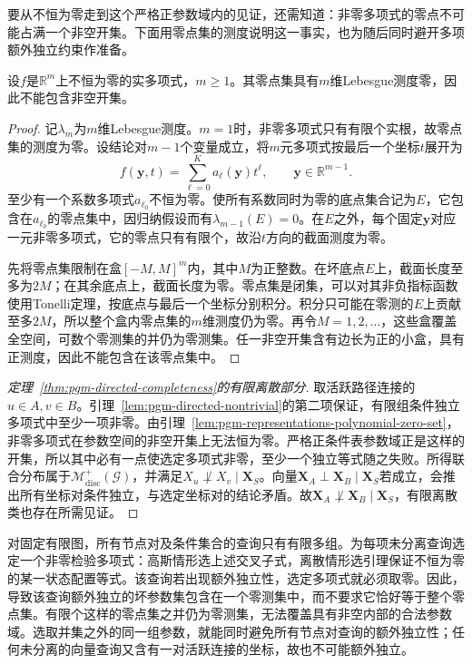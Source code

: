 要从不恒为零走到这个严格正参数域内的见证，还需知道：非零多项式的零点不可能占满一个非空开集。下面用零点集的测度说明这一事实，也为随后同时避开多项额外独立约束作准备。

\begin{lemma}[非零多项式的零点集]
  \label{lem:pgm-representations-polynomial-zero-set}
  设$f$是$\mathbb R^m$上不恒为零的实多项式，$m\geq1$。其零点集具有$m$维Lebesgue测度零，因此不能包含非空开集。
\end{lemma}

\begin{proof}
记$\lambda_m$为$m$维Lebesgue测度。$m=1$时，非零多项式只有有限个实根，故零点集的测度为零。设结论对$m-1$个变量成立，将$m$元多项式按最后一个坐标$t$展开为
\[
  f(\bm y,t)=\sum_{\ell=0}^{K}a_\ell(\bm y)t^\ell,
  \qquad \bm y\in\mathbb R^{m-1}.
\]
至少有一个系数多项式$a_{\ell_0}$不恒为零。使所有系数同时为零的底点集合记为$E$，它包含在$a_{\ell_0}$的零点集中，因归纳假设而有$\lambda_{m-1}(E)=0$。在$E$之外，每个固定$\bm y$对应一元非零多项式，它的零点只有有限个，故沿$t$方向的截面测度为零。

先将零点集限制在盒$[-M,M]^m$内，其中$M$为正整数。在坏底点$E$上，截面长度至多为$2M$；在其余底点上，截面长度为零。零点集是闭集，可以对其非负指标函数使用Tonelli定理，按底点与最后一个坐标分别积分。积分只可能在零测的$E$上贡献至多$2M$，所以整个盒内零点集的$m$维测度仍为零。再令$M=1,2,\ldots$，这些盒覆盖全空间，可数个零测集的并仍为零测集。任一非空开集含有边长为正的小盒，具有正测度，因此不能包含在该零点集中。
\end{proof}

\begin{proof}[定理~\ref{thm:pgm-directed-completeness}的有限离散部分]
取活跃路径连接的$u\in A,v\in B$。引理~\ref{lem:pgm-directed-nontrivial}的第二项保证，有限组条件独立多项式中至少一项非零。由引理~\ref{lem:pgm-representations-polynomial-zero-set}，非零多项式在参数空间的非空开集上无法恒为零。严格正条件表参数域正是这样的开集，所以其中必有一点使选定多项式非零，至少一个独立等式随之失败。所得联合分布属于$\mathcal{M}_{\mathrm{disc}}^{+}(\mathcal{G})$，并满足$X_u\not\perp X_v\mid\bm X_S$。向量$\bm X_A\perp\bm X_B\mid\bm X_S$若成立，会推出所有坐标对条件独立，与选定坐标对的结论矛盾。故$\bm X_A\not\perp\bm X_B\mid\bm X_S$，有限离散类也存在所需见证。
\end{proof}

对固定有限图，所有节点对及条件集合的查询只有有限多组。为每项未分离查询选定一个非零检验多项式：高斯情形选上述交叉子式，离散情形选引理保证不恒为零的某一状态配置等式。该查询若出现额外独立性，选定多项式就必须取零。因此，导致该查询额外独立的坏参数集包含在一个零测集中，而不要求它恰好等于整个零点集。有限个这样的零点集之并仍为零测集，无法覆盖具有非空内部的合法参数域。选取并集之外的同一组参数，就能同时避免所有节点对查询的额外独立性；任何未分离的向量查询又含有一对活跃连接的坐标，故也不可能额外独立。

